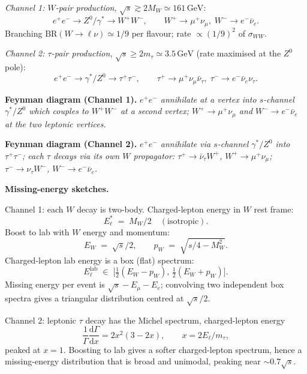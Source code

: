 \documentclass[11pt]{article}
\newcommand{\de}{\mathrm{d}}
\begin{document}
\emph{Channel 1: $W$-pair production}, $\sqrt{s}\gtrsim 2M_{W}\simeq 161\,\text{GeV}$:
\[
e^{+}e^{-}\to Z^{0}/\gamma^{*}\to W^{+}W^{-},\qquad W^{+}\to\mu^{+}\nu_{\mu},\;W^{-}\to e^{-}\bar\nu_{e}.
\]
Branching $\mathrm{BR}(W\to\ell\nu)\simeq 1/9$ per flavour; rate $\propto(1/9)^{2}$ of $\sigma_{WW}$.

\emph{Channel 2: $\tau$-pair production}, $\sqrt{s}\geq 2m_{\tau}\simeq 3.5\,\text{GeV}$ (rate maximised at the $Z^{0}$ pole):
\[
e^{+}e^{-}\to\gamma^{*}/Z^{0}\to\tau^{+}\tau^{-},\qquad\tau^{+}\to\mu^{+}\nu_{\mu}\bar\nu_{\tau},\;\tau^{-}\to e^{-}\bar\nu_{e}\nu_{\tau}.
\]

\textbf{Feynman diagram (Channel 1).} \emph{$e^{+}e^{-}$ annihilate at a vertex into $s$-channel $\gamma^{*}/Z^{0}$ which couples to $W^{+}W^{-}$ at a second vertex; $W^{+}\to\mu^{+}\nu_{\mu}$ and $W^{-}\to e^{-}\bar\nu_{e}$ at the two leptonic vertices.}

\textbf{Feynman diagram (Channel 2).} \emph{$e^{+}e^{-}$ annihilate via $s$-channel $\gamma^{*}/Z^{0}$ into $\tau^{+}\tau^{-}$; each $\tau$ decays via its own $W$ propagator: $\tau^{+}\to\bar\nu_{\tau}W^{+}$, $W^{+}\to\mu^{+}\nu_{\mu}$; $\tau^{-}\to\nu_{\tau}W^{-}$, $W^{-}\to e^{-}\bar\nu_{e}$.}

\textbf{Missing-energy sketches.}

Channel 1: each $W$ decay is two-body. Charged-lepton energy in $W$ rest frame:
\[
E_{\ell}^{*}\;=\;M_{W}/2\quad(\text{isotropic}).
\]
Boost to lab with $W$ energy and momentum:
\[
E_{W}\;=\;\sqrt{s}/2,\qquad p_{W}\;=\;\sqrt{s/4-M_{W}^{2}}.
\]
Charged-lepton lab energy is a box (flat) spectrum:
\[
E_{\ell}^{\text{lab}}\;\in\;\bigl[\tfrac12(E_{W}-p_{W}),\,\tfrac12(E_{W}+p_{W})\bigr].
\]
Missing energy per event is $\sqrt{s}-E_{\mu}-E_{e}$; convolving two independent box spectra gives a triangular distribution centred at $\sqrt{s}/2$.

Channel 2: leptonic $\tau$ decay has the Michel spectrum, charged-lepton energy
\[
\frac{1}{\Gamma}\frac{\de\Gamma}{\de x}=2x^{2}(3-2x),\qquad x=2E_{\ell}/m_{\tau},
\]
peaked at $x=1$. Boosting to lab gives a softer charged-lepton spectrum, hence a missing-energy distribution that is broad and unimodal, peaking near $\sim 0.7\sqrt{s}$.
\end{document}
